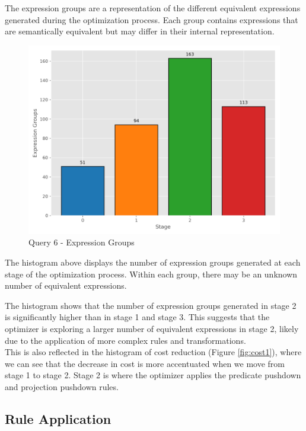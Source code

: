 \documentclass[a4paper,12pt]{scrreprt}
\begin{document}
The expression groups are a representation of the different equivalent expressions generated during the optimization process. Each group contains expressions that are semantically equivalent but may differ in their internal representation. 

\begin{figure}[H]
    \centering
    \includegraphics[width=\linewidth]{img/expression_groups/q6_expression_groups.png}
    \caption{Query 6 - Expression Groups}
    \label{fig:exprgroups1}
\end{figure}

The histogram above displays the number of expression groups generated at each stage of the optimization process. Within each group, there may be an unknown number of equivalent expressions. 

The histogram shows that the number of expression groups generated in stage 2 is significantly higher than in stage 1 and stage 3. This suggests that the optimizer is exploring a larger number of equivalent expressions in stage 2, likely due to the application of more complex rules and transformations. \\
This is also reflected in the histogram of cost reduction (Figure \ref{fig:cost1}), where we can see that the decrease in cost is more accentuated when we move from stage 1 to stage 2.
Stage 2 is where the optimizer applies the predicate pushdown and projection pushdown rules. 

\subsection{Rule Application}
\end{document}
